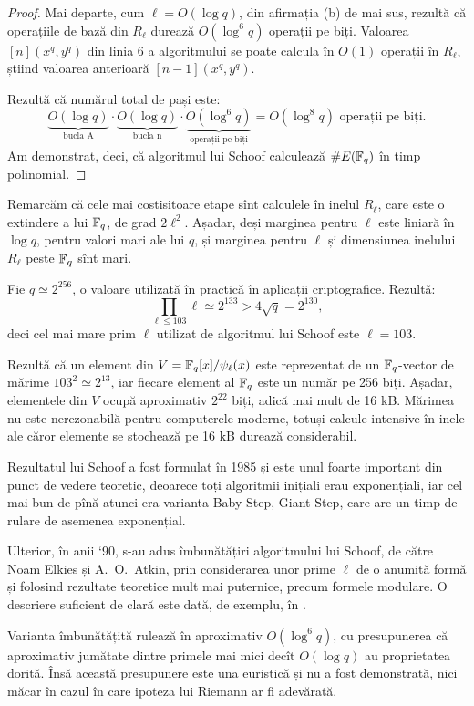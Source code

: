 \begin{proof}
    Mai departe, cum $ \ell = O(\log q) $, din afirmația (b) de mai sus,
    rezultă că operațiile de bază din $ R_\ell $ durează $ O(\log^6 q) $
    operații pe biți. Valoarea $ [n](x^q, y^q) $ din linia 6 a algoritmului
    se poate calcula în $ O(1) $ operații în $ R_\ell $, știind valoarea
    anterioară $ [n-1](x^q, y^q) $.

    Rezultă că numărul total de pași este:
    \[
        \underbrace{O(\log q)}_{\text{bucla A}} \cdot \underbrace{O(\log q)}_{\text{bucla n}} \cdot %
        \underbrace{O(\log^6 q)}_{\text{operații pe biți}} = O(\log^8 q) \text{ operații pe biți}.
    \]
    Am demonstrat, deci, că algoritmul lui Schoof calculează $ \# E(\mathbb{F}_q) $ în timp polinomial.
\end{proof}

Remarcăm că cele mai costisitoare etape sînt calculele în inelul $ R_\ell $, care este o
extindere a lui $ \mathbb{F}_q $, de grad $ 2 \ell^2 $. Așadar, deși marginea pentru $ \ell $
este liniară în $ \log q $, pentru valori mari ale lui $ q $, și marginea pentru $ \ell $
și dimensiunea inelului $ R_\ell $ peste $ \mathbb{F}_q $ sînt mari.

\begin{example}\label{exm:schoof}
  Fie $ q \simeq 2^{256} $, o valoare utilizată în practică în aplicații
  criptografice. Rezultă:
  \[
    \prod_{\ell \leq 103} \ell \simeq 2^{133} > 4 \sqrt{q} = 2^{130},
  \]
  deci cel mai mare prim $ \ell $ utilizat de algoritmul lui Schoof este $ \ell = 103 $.

  Rezultă că un element din $ V = \mathbb{F}_q[x]/\psi_\ell(x) $ este reprezentat de un
  $ \mathbb{F}_q $-vector de mărime $ 103^2 \simeq 2^{13} $, iar fiecare element al
  $ \mathbb{F}_q $ este un număr pe 256 biți. Așadar, elementele din $ V $ ocupă
  aproximativ $ 2^{22} $ biți, adică mai mult de 16 kB. Mărimea nu este nerezonabilă
  pentru computerele moderne, totuși calcule intensive în inele ale căror elemente se
  stochează pe 16 kB durează considerabil.
\end{example}

Rezultatul lui Schoof a fost formulat în 1985 și este unul foarte important din punct
de vedere teoretic, deoarece toți algoritmii inițiali erau exponențiali, iar
cel mai bun de pînă atunci era varianta Baby Step, Giant Step, care are un timp
de rulare de asemenea exponențial.

Ulterior, în anii `90, s-au adus îmbunătățiri algoritmului lui Schoof, de
către Noam Elkies și A.\ O.\ Atkin, prin considerarea unor prime $ \ell $
de o anumită formă și folosind rezultate teoretice mult mai puternice,
precum formele modulare. O descriere suficient de clară este dată, de exemplu,
în \cite{galin}.

Varianta îmbunătățită rulează în aproximativ $ O(\log^6 q) $, cu presupunerea
că aproximativ ju\-mă\-ta\-te dintre primele mai mici decît $ O(\log q) $ au
proprietatea dorită. Însă această presupunere este una euristică și nu
a fost demonstrată, nici măcar în cazul în care ipoteza lui Riemann ar fi
adevărată.


